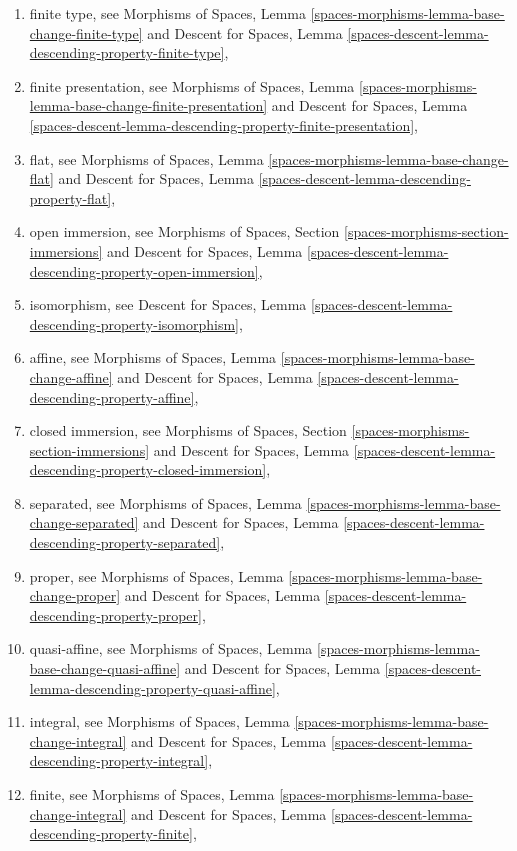 \begin{enumerate}
\item finite type, see
Morphisms of Spaces,
Lemma \ref{spaces-morphisms-lemma-base-change-finite-type}
and
Descent for Spaces,
Lemma \ref{spaces-descent-lemma-descending-property-finite-type},
\item finite presentation, see
Morphisms of Spaces,
Lemma \ref{spaces-morphisms-lemma-base-change-finite-presentation}
and
Descent for Spaces, Lemma
\ref{spaces-descent-lemma-descending-property-finite-presentation},
\item flat, see
Morphisms of Spaces,
Lemma \ref{spaces-morphisms-lemma-base-change-flat}
and
Descent for Spaces,
Lemma \ref{spaces-descent-lemma-descending-property-flat},
\item open immersion, see
Morphisms of Spaces,
Section \ref{spaces-morphisms-section-immersions}
and
Descent for Spaces,
Lemma \ref{spaces-descent-lemma-descending-property-open-immersion},
\item isomorphism, see
Descent for Spaces,
Lemma \ref{spaces-descent-lemma-descending-property-isomorphism},
\item affine, see
Morphisms of Spaces,
Lemma \ref{spaces-morphisms-lemma-base-change-affine}
and
Descent for Spaces,
Lemma \ref{spaces-descent-lemma-descending-property-affine},
\item closed immersion, see
Morphisms of Spaces, Section \ref{spaces-morphisms-section-immersions}
and
Descent for Spaces,
Lemma \ref{spaces-descent-lemma-descending-property-closed-immersion},
\item separated, see
Morphisms of Spaces,
Lemma \ref{spaces-morphisms-lemma-base-change-separated}
and
Descent for Spaces,
Lemma \ref{spaces-descent-lemma-descending-property-separated},
\item proper, see
Morphisms of Spaces,
Lemma \ref{spaces-morphisms-lemma-base-change-proper}
and
Descent for Spaces,
Lemma \ref{spaces-descent-lemma-descending-property-proper},
\item quasi-affine, see
Morphisms of Spaces,
Lemma \ref{spaces-morphisms-lemma-base-change-quasi-affine}
and
Descent for Spaces,
Lemma \ref{spaces-descent-lemma-descending-property-quasi-affine},
\item integral, see
Morphisms of Spaces,
Lemma \ref{spaces-morphisms-lemma-base-change-integral}
and
Descent for Spaces,
Lemma \ref{spaces-descent-lemma-descending-property-integral},
\item finite, see
Morphisms of Spaces,
Lemma \ref{spaces-morphisms-lemma-base-change-integral}
and
Descent for Spaces,
Lemma \ref{spaces-descent-lemma-descending-property-finite},

\end{enumerate}
